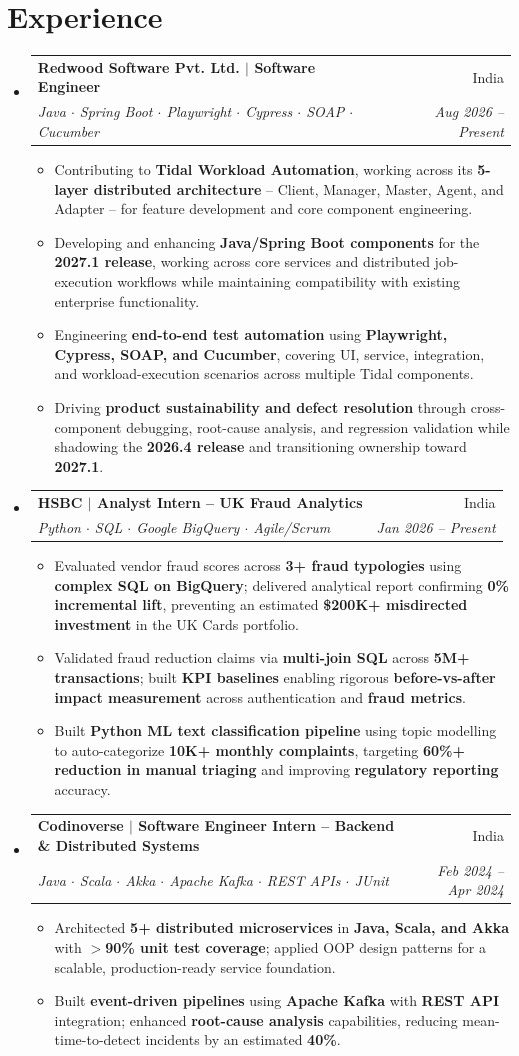\documentclass[letterpaper,10.5pt]{article}
\makeatletter
\newcommand{\resumeItem}[1]{\item\small{#1\vspace{-2.5pt}}}
\newcommand{\resumeSubheading}[4]{
\vspace{-2pt}\item
\begin{tabular*}{0.97\textwidth}[t]{l@{\extracolsep{\fill}}r}
\textbf{#1} & \small #2 \\
\textit{\small #3} & \textit{\small #4} \\
\end{tabular*}\vspace{-7pt}
}
\newcommand{\resumeSubHeadingListStart}{\begin{itemize}[leftmargin=0.12in, label={}]}
\newcommand{\resumeSubHeadingListEnd}{\end{itemize}}
\newcommand{\resumeItemListStart}{\begin{itemize}[leftmargin=0.2in]\vspace{-2pt}}
\newcommand{\resumeItemListEnd}{\end{itemize}\vspace{-6pt}}
\makeatother
\begin{document}
\section{Experience}
\resumeSubHeadingListStart
\resumeSubheading
{Redwood Software Pvt. Ltd. \textnormal{$|$ Software Engineer}}{India}
{Java $\cdot$ Spring Boot $\cdot$ Playwright $\cdot$ Cypress $\cdot$ SOAP $\cdot$ Cucumber}{Aug 2026 -- Present}
\resumeItemListStart
\resumeItem{Contributing to \textbf{Tidal Workload Automation}, working across its \textbf{5-layer distributed architecture} -- Client, Manager, Master, Agent, and Adapter -- for feature development and core component engineering.}
\resumeItem{Developing and enhancing \textbf{Java/Spring Boot components} for the \textbf{2027.1 release}, working across core services and distributed job-execution workflows while maintaining compatibility with existing enterprise functionality.}
\resumeItem{Engineering \textbf{end-to-end test automation} using \textbf{Playwright, Cypress, SOAP, and Cucumber}, covering UI, service, integration, and workload-execution scenarios across multiple Tidal components.}
\resumeItem{Driving \textbf{product sustainability and defect resolution} through cross-component debugging, root-cause analysis, and regression validation while shadowing the \textbf{2026.4 release} and transitioning ownership toward \textbf{2027.1}.}
\resumeItemListEnd
\resumeSubheading
{HSBC \textnormal{$|$ Analyst Intern -- UK Fraud Analytics}}{India}
{Python $\cdot$ SQL $\cdot$ Google BigQuery $\cdot$ Agile/Scrum}{Jan 2026 -- Present}
\resumeItemListStart
\resumeItem{Evaluated vendor fraud scores across \textbf{3+ fraud typologies} using \textbf{complex SQL on BigQuery}; delivered analytical report confirming \textbf{0\% incremental lift}, preventing an estimated \textbf{\$200K+ misdirected investment} in the UK Cards portfolio.}
\resumeItem{Validated fraud reduction claims via \textbf{multi-join SQL} across \textbf{5M+ transactions}; built \textbf{KPI baselines} enabling rigorous \textbf{before-vs-after impact measurement} across authentication and \textbf{fraud metrics}.}
\resumeItem{Built \textbf{Python ML text classification pipeline} using topic modelling to auto-categorize \textbf{10K+ monthly complaints}, targeting \textbf{60\%+ reduction in manual triaging} and improving \textbf{regulatory reporting} accuracy.}
\resumeItemListEnd
\resumeSubheading
{Codinoverse \textnormal{$|$ Software Engineer Intern -- Backend \& Distributed Systems}}{India}
{Java $\cdot$ Scala $\cdot$ Akka $\cdot$ Apache Kafka $\cdot$ REST APIs $\cdot$ JUnit}{Feb 2024 -- Apr 2024}
\resumeItemListStart
\resumeItem{Architected \textbf{5+ distributed microservices} in \textbf{Java, Scala, and Akka} with \textbf{$>$90\% unit test coverage}; applied OOP design patterns for a scalable, production-ready service foundation.}
\resumeItem{Built \textbf{event-driven pipelines} using \textbf{Apache Kafka} with \textbf{REST API} integration; enhanced \textbf{root-cause analysis} capabilities, reducing mean-time-to-detect incidents by an estimated \textbf{40\%}.}
\resumeItemListEnd
\resumeSubHeadingListEnd\vspace{-2pt}
\end{document}
